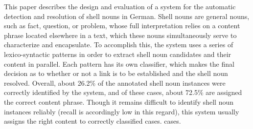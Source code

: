 This paper describes the design and evaluation of a system for the automatic detection and resolution of shell nouns in German. Shell nouns are general nouns, such as fact, question, or problem, whose full interpretation relies on a content phrase located elsewhere in a text, which these nouns simultaneously serve to characterize and encapsulate. To accomplish this, the system uses a series of lexico-syntactic patterns in order to extract shell noun candidates and their content in parallel. Each pattern has its own classifier, which makes the final decision as to whether or not a link is to be established and the shell noun resolved. Overall, about 26.2\% of the annotated shell noun instances were correctly identified by the system, and of these cases, about 72.5\% are assigned the correct content phrase. Though it remains difficult to identify shell noun instances reliably (recall is accordingly low in this regard), this system usually assigns the right content to correctly classified cases. cases.
